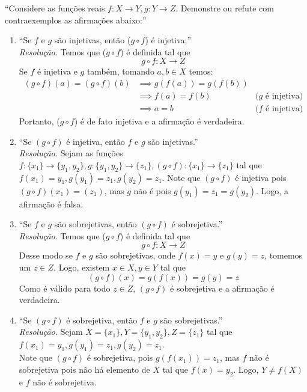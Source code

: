 \enquote{Considere as funções reais $f: X \rightarrow Y, g: Y \rightarrow Z$. Demonstre ou refute com contraexemplos as afirmações abaixo:}
    \begin{enumerate}
    \item \enquote{Se $f$ e $g$ são injetivas, então ($g \circ f$) é injetiva;} 
    \\ \emph{Resolução.} Temos que ($g \circ f$) é definida tal que
    \begin{displaymath}
        g \circ f: X \rightarrow Z 
    \end{displaymath}
    Se $f$ é injetiva e $g$ também, tomando $a, b \in X$ temos:
    \begin{align*}
        (g \circ f)(a) = (g \circ f)(b) & \implies
        g(f(a)) = g(f(b)) \\ & \implies
        f(a) = f(b) \quad &\text{($g$ é injetiva)} \\ & \implies
        a = b \quad &\text{($f$ é injetiva)}
    \end{align*}
    Portanto, ($g \circ f$) é de fato injetiva e a afirmação é verdadeira.
    \item \enquote{Se $(g \circ f)$ é injetiva, então $f$ e $g$ são injetivas.} 
    \\ \emph{Resolução.} Sejam as funções $f: \{x_1\} \rightarrow \{y_1, y_2\}, g: \{y_1, y_2\} \rightarrow \{z_1\}, (g \circ f): \{x_1\} \rightarrow \{z_1\}$ tal que $f(x_1) = y_1, g(y_1) = z_1, g(y_2) = z_1$.
    Note que $(g \circ f)$ é injetiva pois $(g \circ f)(x_1) = (z_1)$, mas $g$ não é pois $g(y_1) = z_1 = g(y_2)$.
    Logo, a afirmação é falsa.
    \item \enquote{Se $f$ e $g$ são sobrejetivas, então $(g\circ f)$ é sobrejetiva.}
    \\ \emph{Resolução}. Temos que ($g \circ f$) é definida tal que
    \begin{displaymath}
        g \circ f: X \rightarrow Z 
    \end{displaymath}
    Desse modo se $f$ e $g$ são sobrejetivas, onde $f(x) = y$ e $g(y) = z$, 
    tomemos um $z \in Z$. Logo, existem $x \in X, y \in Y$ tal que
    \begin{displaymath}
        (g\circ f)(x) = g(f(x)) = g(y) = z
    \end{displaymath}
    Como é válido para todo $z \in Z$, $(g \circ f)$ é sobrejetiva e a afirmação é verdadeira.
    \item \enquote{Se $(g \circ f)$ é sobrejetiva, então $f \text{ e } g$ são sobrejetivas.}
    \\ \emph{Resolução.} Sejam $X = \{ x_1 \}, Y = \{ y_1, y_2 \}, Z = \{ z_1 \}$ tal que $f(x_1) = y_1, g(y_1) = z_1, g(y_2) = z_1$. \\
    Note que $(g \circ f)$ é sobrejetiva, pois $g(f(x_1)) = z_1$, mas $f$ não é sobrejetiva pois não há elemento de $X$ tal que $f(x) = y_2$. Logo, $Y \ne f(X)$ e $f$ não é sobrejetiva.
\end{enumerate}